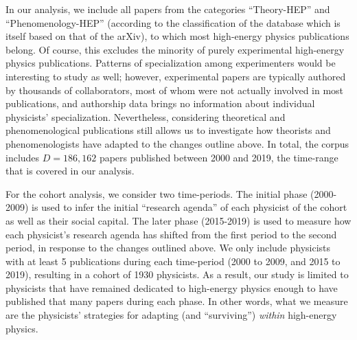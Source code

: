 \documentclass{article}
\begin{document}
In our analysis, we include all papers from the categories ``Theory-HEP'' and ``Phenomenology-HEP'' (according to the classification of the database which is itself based on that of the arXiv), to which most  high-energy physics publications belong. Of course, this excludes the minority of purely experimental high-energy physics publications. Patterns of specialization among experimenters would be interesting to study as well; however, experimental papers are typically authored by thousands of collaborators, most of whom were not actually involved in most publications, and authorship data brings no information about individual physicists' specialization. Nevertheless, considering theoretical and phenomenological publications still allows us to investigate how theorists and phenomenologists have adapted to the changes outline above. In total, the corpus includes $D=186,162$ papers published between 2000 and 2019, the time-range that is covered in our analysis. 

For the cohort analysis, we consider two time-periods. The initial phase (2000-2009) is used to infer the initial ``research agenda'' of each physicist of the cohort as well as their social capital. The later phase (2015-2019) is used to measure how each physicist's research agenda has shifted from the first period to the second period, in response to the changes outlined above. We only include physicists with at least 5 publications during each time-period (2000 to 2009, and 2015 to 2019), resulting in a cohort of 1930 physicists. As a result, our study is limited to physicists that have remained dedicated to high-energy physics enough to have published that many papers during each phase. In other words, what we measure are the physicists' strategies for adapting (and ``surviving'') \textit{within} high-energy physics. 
\end{document}

